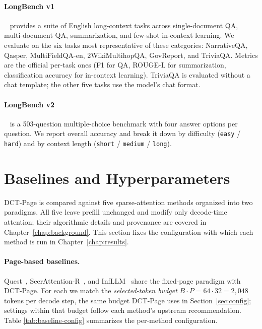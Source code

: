 \paragraph{LongBench v1}~\cite{bai2024longbench} provides a suite of
English long-context tasks across single-document QA, multi-document
QA, summarization, and few-shot in-context learning.  We evaluate on
the six tasks most representative of these categories:
NarrativeQA, Qasper, MultiFieldQA-en, 2WikiMultihopQA, GovReport, and
TriviaQA.  Metrics are the official per-task ones (F1 for QA, ROUGE-L
for summarization, classification accuracy for in-context learning).
TriviaQA is evaluated without a chat template; the other five tasks
use the model's chat format.

\paragraph{LongBench v2}~\cite{bai2025longbenchv2} is a 503-question
multiple-choice benchmark with four answer options per question.  We
report overall accuracy and break it down by difficulty
(\texttt{easy} / \texttt{hard}) and by context length
(\texttt{short} / \texttt{medium} / \texttt{long}).


\section{Baselines and Hyperparameters}\label{sec:baselines}

DCT-Page is compared against five sparse-attention methods organized
into two paradigms.  All five leave prefill unchanged and modify only
decode-time attention; their algorithmic details and provenance are
covered in Chapter~\ref{chap:background}.  This section fixes the
configuration with which each method is run in
Chapter~\ref{chap:results}.

\paragraph{Page-based baselines.}
Quest~\cite{tang2024quest},
SeerAttention-R~\cite{gao2025seerattention}, and
InfLLM~\cite{xiao2024infllm} share the fixed-page paradigm with
DCT-Page.  For each we match the \emph{selected-token budget}
$B \cdot P = 64 \cdot 32 = 2{,}048$ tokens per decode step, the same
budget DCT-Page uses in Section~\ref{sec:config}; settings within
that budget follow each method's upstream recommendation.  Table
\ref{tab:baseline-config} summarizes the per-method configuration.

